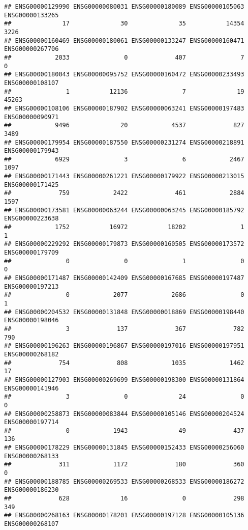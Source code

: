 \documentclass[
]{article}
\begin{document}
\begin{verbatim}
## ENSG00000129990 ENSG00000080031 ENSG00000180089 ENSG00000105063 ENSG00000133265 
##              17              30              35           14354            3226 
## ENSG00000160469 ENSG00000180061 ENSG00000133247 ENSG00000160471 ENSG00000267706 
##            2033               0             407               7               0 
## ENSG00000180043 ENSG00000095752 ENSG00000160472 ENSG00000233493 ENSG00000108107 
##               1           12136               7              19           45263 
## ENSG00000108106 ENSG00000187902 ENSG00000063241 ENSG00000197483 ENSG00000090971 
##            9496              20            4537             827            3489 
## ENSG00000179954 ENSG00000187550 ENSG00000231274 ENSG00000218891 ENSG00000179943 
##            6929               3               6            2467            1097 
## ENSG00000171443 ENSG00000261221 ENSG00000179922 ENSG00000213015 ENSG00000171425 
##             759            2422             461            2884            1597 
## ENSG00000173581 ENSG00000063244 ENSG00000063245 ENSG00000185792 ENSG00000223638 
##            1752           16972           18202               1               1 
## ENSG00000229292 ENSG00000179873 ENSG00000160505 ENSG00000173572 ENSG00000179709 
##               0               0               1               0               0 
## ENSG00000171487 ENSG00000142409 ENSG00000167685 ENSG00000197487 ENSG00000197213 
##               0            2077            2686               0               1 
## ENSG00000204532 ENSG00000131848 ENSG00000018869 ENSG00000198440 ENSG00000198046 
##               3             137             367             782             790 
## ENSG00000196263 ENSG00000196867 ENSG00000197016 ENSG00000197951 ENSG00000268182 
##             754             808            1035            1462              17 
## ENSG00000127903 ENSG00000269699 ENSG00000198300 ENSG00000131864 ENSG00000141946 
##               3               0              24               0               0 
## ENSG00000258873 ENSG00000083844 ENSG00000105146 ENSG00000204524 ENSG00000197714 
##               0            1943              49             437             136 
## ENSG00000178229 ENSG00000131845 ENSG00000152433 ENSG00000256060 ENSG00000268133 
##             311            1172             180             360               0 
## ENSG00000188785 ENSG00000269533 ENSG00000268533 ENSG00000186272 ENSG00000186230 
##             628              16               0             298             349 
## ENSG00000268163 ENSG00000178201 ENSG00000197128 ENSG00000105136 ENSG00000268107 

\end{verbatim}
\end{document}
